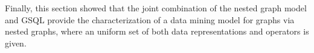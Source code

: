 
Finally, this section showed that the joint combination of the nested graph model and GSQL provide the characterization of a data mining model for graphs via nested graphs, where an uniform set of both data representations and operators is given.
